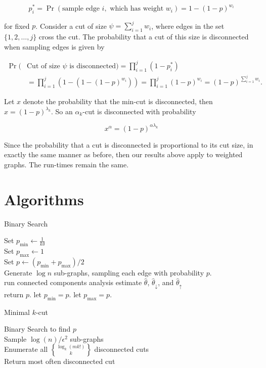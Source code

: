 \documentclass{acm_proc_article-sp}
\DeclareRobustCommand{\stirling}{\genfrac\{\}{0pt}{}}
\begin{document}
\[
p^*_i = \Pr(\text{sample edge } i, \text{ which has weight } w_i) = 1 - (1-p)^{w_i} 
\]

for fixed $p$. Consider a cut of size $\psi = \sum_{i=1}^j w_i$, where edges in the set $\{1, 2, \ldots, j\}$ cross the cut. The probability that a cut of this size is disconnected when sampling edges is given by

\begin{align*}
\Pr(&\text{Cut of size } \psi \text{ is disconnected}) = \prod_{i=1}^j (1 - p_i^*) \\
&= \prod_{i=1}^j (1 - (1 - (1-p)^{w_i})) = \prod_{i=1}^j (1-p)^{w_i} = (1-p)^{\sum_{i=1}^j w_i}.
\end{align*}

Let $x$ denote the probability that the min-cut is disconnected, then
$x = (1-p)^{\lambda_k}$. So an $\alpha_k$-cut is disconnected with probability

\[
x^\alpha = (1-p)^{\alpha \lambda_k}
\]

Since the probability that a cut is disconnected is proportional to its cut size, in exactly the same manner as before, then our results above apply to weighted graphs. The run-times remain the same.

\section{Algorithms}

\LinesNumbered
\begin{algorithm}
\caption{Binary Search}
Set $p_{\text{min}} \leftarrow \frac{1}{k\delta}$ \\
Set $p_{\text{max}} \leftarrow 1$ \\
 {
  Set $p \leftarrow (p_{\text{min}} + p_{\text{max}})/2$ \\
  Generate $\log n$ sub-graphs, sampling each edge with probability   $p$. \\
   {
    run connected components analysis
  }
  estimate $\hat{\theta}$, $\hat{\theta}_{\downarrow}$, and $\hat{\theta}_{\uparrow}$ \\
   {
    return $p$.
  }
  \uElseIf{$\hat{\theta}_{\downarrow} > \hat{\theta}_{\uparrow}$} {
    let $p_{\text{min}} = p$.
  }
  \ElseIf{$\hat{\theta}_{\uparrow} > \hat{\theta}_{\downarrow}$} {
    let $p_{\text{max}} = p$.
  }
}
\end{algorithm}

\LinesNumbered
\begin{algorithm}
\caption{Minimal $k$-cut}
Binary Search to find $p$ \\
Sample $\log(n)/\epsilon^2$ sub-graphs \\
Enumerate all $\stirling{\log_k(mk!)}{k}$ disconnected cuts \\
Return most often disconnected cut
\end{algorithm}
\end{document}
